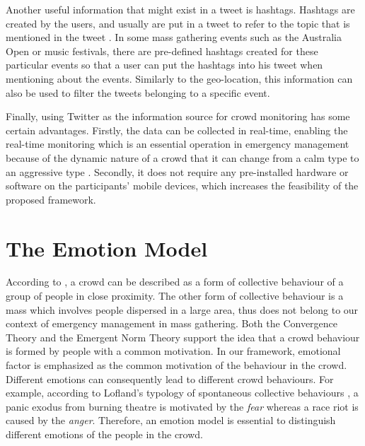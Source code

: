 Another useful information that might exist in a tweet is hashtags. Hashtags are created by the users, and usually are put in a tweet to refer to the topic that is mentioned in the tweet \citep{mohammad2014using}. In some mass gathering events such as the Australia Open or music festivals, there are pre-defined hashtags created for these particular events so that a user can put the hashtags into his tweet when mentioning about the events. Similarly to the geo-location, this information can also be used to filter the tweets belonging to a specific event.

Finally, using Twitter as the information source for crowd monitoring has some certain advantages. Firstly, the data can be collected in real-time, enabling the real-time monitoring which is an essential operation in emergency management because of the dynamic nature of a crowd that it can change from a calm type to an aggressive type \citep{Berlonghi1995}. Secondly, it does not require any pre-installed hardware or software on the participants' mobile devices, which increases the feasibility of the proposed framework.

\section{The Emotion Model}

According to \citet{Kornblum2011}, a crowd can be described as a form of collective behaviour of a group of people in close proximity. The other form of collective behaviour is a mass which involves people dispersed in a large area, thus does not belong to our context of emergency management in mass gathering. Both the Convergence Theory and the Emergent Norm Theory \citep{mcphail1991myth} support the idea that a crowd behaviour is formed by people with a common motivation. In our framework, emotional factor is emphasized as the common motivation of the behaviour in the crowd. Different emotions can consequently lead to different crowd behaviours. For example, according to Lofland's typology of spontaneous collective behaviours \citep{Kornblum2011}, a panic exodus from burning theatre is motivated by the \textit{fear} whereas a race riot is caused by the \textit{anger}. Therefore, an emotion model is essential to distinguish different emotions of the people in the crowd.

